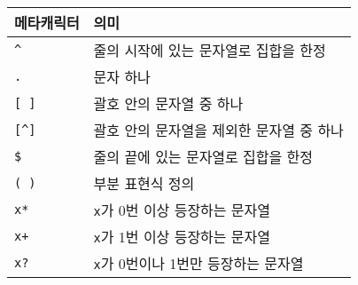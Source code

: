 \begin{tabularx}{\textwidth}{l|X}
	메타캐릭터 & 의미 \\
	\hline
	\texttt{\textasciicircum} & 줄의 시작에 있는 문자열로 집합을 한정 \\
	\texttt{.} & 문자 하나 \\
	\texttt{[ ]} & 괄호 안의 문자열 중 하나 \\
	\texttt{[\textasciicircum\space]} & 괄호 안의 문자열을 제외한 문자열 중 하나 \\
	\texttt{\$} & 줄의 끝에 있는 문자열로 집합을 한정 \\
	\texttt{( )} & 부분 표현식 정의 \\
	\texttt{x*} & \texttt{x}가 0번 이상 등장하는 문자열 \\
	\texttt{x+} & \texttt{x}가 1번 이상 등장하는 문자열 \\
	\texttt{x?} & \texttt{x}가 0번이나 1번만 등장하는 문자열 \\
\end{tabularx}


